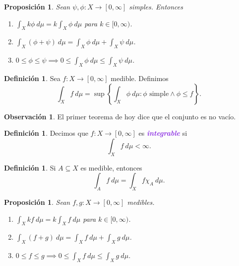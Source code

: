 \documentclass{article}
\newtheorem{proposition}[theorem]{Proposición}
\theoremstyle{definition}
\newtheorem{definition}[theorem]{Definición}
\newtheorem*{obs}{Observación}
\theoremstyle{remark}
\numberwithin{equation}{section}
\newcommand{\oo}{\infty}
\newcommand{\set}[1]{\left\{ #1 \right\}}
\newcommand{\ds}{\displaystyle}
\newcommand{\wea}[1]{\textcolor{BlueViolet}{\textbf{\emph{#1}}}}
\begin{document}
\begin{proposition} %
  Sean $\psi,\phi \colon X \to [0,\oo]$ simples. Entonces
  \begin{enumerate}[(1)]
    \item $\ds \int_X k\phi \ d\mu = k \int_X \phi \ d\mu$ para $k \in [0,\oo)$.
    \item $\ds \int_X (\phi + \psi) \ d\mu = \int_X \phi \ d\mu + \int_X \psi \ d\mu$.
    \item $\ds 0 \leq \phi \leq \psi \implies 0 \leq \int_X \phi \ d\mu \leq \int_X \psi \ d\mu$.
  \end{enumerate}
\end{proposition}

\begin{definition}
  Sea $f \colon X \to [0,\oo]$ medible. Definimos 
  \[ \int_X f \ d\mu = \sup\set{\int_X \phi \ d\mu \colon \phi \text{ simple} \land \phi \leq f}. \]
\end{definition}

\begin{obs}
  El primer teorema de hoy dice que el conjunto es no vacío.
\end{obs}

\begin{definition}
  Decimos que $f \colon X \to [0,\oo]$ es \wea{integrable} si 
  \[ \int_X f \ d\mu < \oo. \]
\end{definition}

\begin{definition}
  Si $A \subseteq X$ es medible, entonces 
  \[ \int_A f \ d\mu = \int_X f \chi_A \ d\mu. \]
\end{definition}

\begin{proposition}
  Sean $f,g \colon X \to [0,\oo]$ medibles.
  \begin{enumerate}[(1)]
    \item $\ds \int_X k f \ d\mu = k \int_X f \ d\mu$ para $k \in [0,\oo)$.
    \item $\ds \int_X (f+g) \ d\mu = \int_X f \ d\mu + \int_X g \ d\mu$.
    \item $\ds 0 \leq f \leq g \implies 0 \leq \int_X f \ d\mu \leq \int_X g \ d\mu$.
  \end{enumerate}
\end{proposition}
\end{document}
